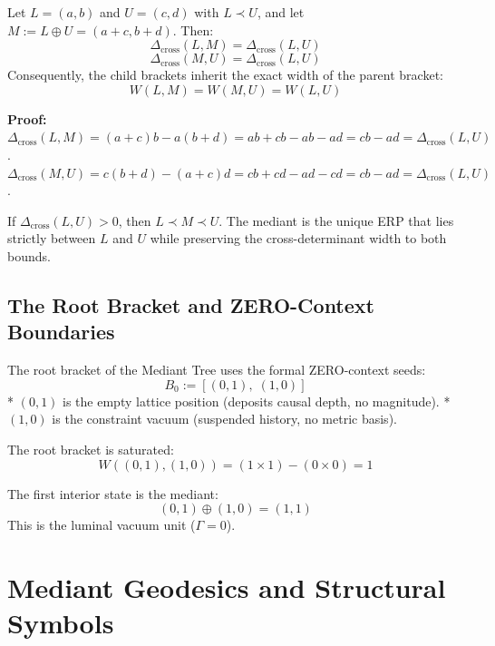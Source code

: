 \documentclass[11pt, letterpaper]{article}
\newcommand{\Dcross}{\Delta_{\mathrm{cross}}}
\newcommand{\med}{\oplus}
\begin{document}
\begin{theorem}\label{thm:width_preservation}
\begin{rsbox}
Let $L = (a, b)$ and $U = (c, d)$ with $L \prec U$, and let $M := L \med U = (a + c, b + d)$.
Then:
\[ \Dcross(L, M) = \Dcross(L, U) \]
\[ \Dcross(M, U) = \Dcross(L, U) \]
Consequently, the child brackets inherit the exact width of the parent bracket:
\[ W(L, M) = W(M, U) = W(L, U) \]

\textbf{Proof:}
$\Dcross(L, M) = (a+c)b - a(b+d) = ab + cb - ab - ad = cb - ad = \Dcross(L, U)$.
$\Dcross(M, U) = c(b+d) - (a+c)d = cb + cd - ad - cd = cb - ad = \Dcross(L, U)$.
\end{rsbox}
\end{theorem}

\begin{corollary}\label{cor:mediant_between}
\begin{rsbox}
If $\Dcross(L, U) > 0$, then $L \prec M \prec U$. The mediant is the unique ERP that lies strictly between $L$ and $U$ while preserving the cross-determinant width to both bounds.
\end{rsbox}
\end{corollary}

\subsection{The Root Bracket and ZERO-Context Boundaries}

\begin{definition}\label{def:root_bracket}
\begin{rsbox}
The root bracket of the Mediant Tree uses the formal ZERO-context seeds:
\[ B_0 := [(0, 1),\; (1, 0)] \]
*   $(0, 1)$ is the empty lattice position (deposits causal depth, no magnitude).
*   $(1, 0)$ is the constraint vacuum (suspended history, no metric basis).

The root bracket is saturated:
\[ W((0, 1), (1, 0)) = (1 \times 1) - (0 \times 0) = 1 \]

The first interior state is the mediant:
\[ (0, 1) \med (1, 0) = (1, 1) \]
This is the luminal vacuum unit ($\Gamma = 0$).
\end{rsbox}
\end{definition}

\section{Mediant Geodesics and Structural Symbols}
\end{document}
